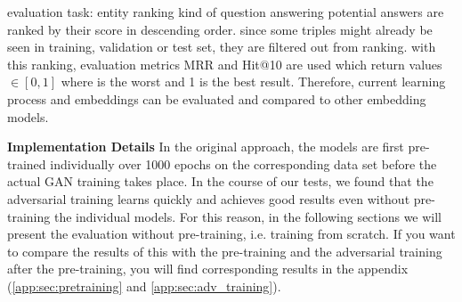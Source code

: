 evaluation task: entity ranking
kind of question answering
potential answers are ranked by their score in descending order.
since some triples might already be seen in training, validation or test set, they are filtered out from ranking.
with this ranking, evaluation metrics MRR and Hit@10 are used which return values $\in [0,1]$ where is the worst and 1 is the best result.
Therefore, current learning process and embeddings can be evaluated and compared to other embedding models.



\textbf{Implementation Details}
In the original \kbgan approach, the models are first pre-trained individually over 1000 epochs on the corresponding data set before the actual \ac{GAN} training takes place.
In the course of our tests, we found that the adversarial training learns quickly and achieves good results even without pre-training the individual models.
For this reason, in the following sections we will present the evaluation without pre-training, i.e. training from scratch.
If you want to compare the results of this with the pre-training and the adversarial training after the pre-training, you will find corresponding results in the appendix (\autoref{app:sec:pretraining} and \ref{app:sec:adv_training}).



